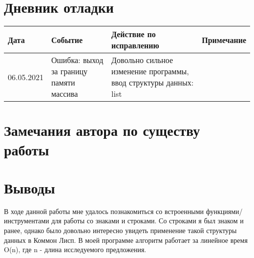 \documentclass[12pt]{article}
\begin{document}
\section{Дневник отладки}
\begin{tabular}{|p{50pt}|p{130pt}|p{130pt}|p{70pt}|}
\hline
Дата & Событие & Действие по исправлению & Примечание \\ \hline
06.05.2021 & Ошибка: выход за границу памяти массива & Довольно сильное изменение программы, ввод структуры данных: list &\\
\hline
\end{tabular}

\section{Замечания автора по существу работы}

\section{Выводы}
В ходе данной работы мне удалось познакомиться со встроенными функциями/инструментами для работы со знаками и строками. Со строками я был знаком и ранее, однако было довольно интересно увидеть применение такой структуры данных в Коммон Лисп. В моей программе алгоритм работает за линейное время O(n), где n - длина исследуемого предложения.
\end{document}

